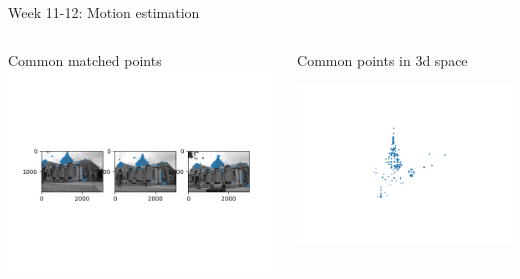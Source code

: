 \documentclass[aspectratio=169,hyperref={pdfpagelabels=false}]{beamer}
\begin{document}
\begin{frame}{ Week 11-12: Motion estimation }
	\begin{columns}
		\begin{column}{.65\textwidth}
			\begin{block}{Common matched points}
			\includegraphics[width=\textwidth]{exercise_imgs/ex11-3.png}
			\end{block}
		\end{column}
		\begin{column}{.3\textwidth}
			\begin{block}{Common points in 3d space}
				\begin{center}
					\includegraphics[width=1.5\textwidth]{exercise_imgs/ex11-4.png}
				\end{center}
			\end{block}
		\end{column}
	\end{columns}
\end{frame}
\end{document}
